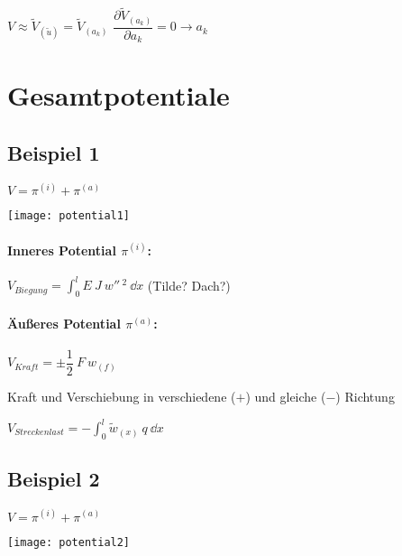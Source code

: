 	$ V \approx \tilde{V}_{(\tilde{u})} = \tilde{V}_{(a_k)} $
		\qquad $ \dfrac{\partial \tilde{V}_{(a_k)}}{\partial a_k} = 0 \rightarrow a_k $
		
\clearpage
\section{Gesamtpotentiale}
\subsection{Beispiel 1}
	$ V = \pi^{(i)} + \pi^{(a)} $
	
	\texttt{[image: potential1]}
	
	
\paragraph{Inneres Potential $ \pi^{(i)} $:}
	\qquad $ V_{Biegung} = \displaystyle\int_{0}^{l} E\ J\ w''\,^2 \ \dd x $  (Tilde? Dach?)
	
\paragraph{Äußeres Potential $ \pi^{(a)} $:}
	$ V_{Kraft} = \pm \dfrac{1}{2}\ F\ w_{(f)} $
	
	Kraft und Verschiebung in verschiedene ($ + $) und gleiche ($ - $) Richtung
	
	$ V_{Streckenlast} = -\displaystyle\int_{0}^{l} \tilde{w}_{(x)}\ q\ \dd x $
	
\subsection{Beispiel 2}
	$ V = \pi^{(i)} + \pi^{(a)} $
	
	\texttt{[image: potential2]}